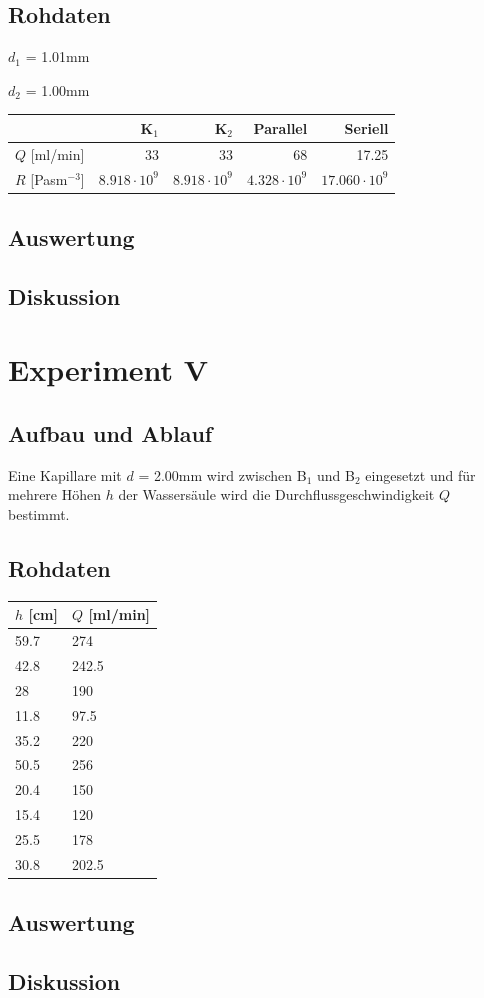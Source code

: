 \documentclass[12pt,a4paper]{article}
\newcommand{\subscript}[1]{$_{#1}$}
\newcommand{\B}[1]{B\subscript{#1}}
\begin{document}
\subsection*{Rohdaten}

$d_1$ = 1.01mm

$d_2$ = 1.00mm

\vspace{5pt}
\begin{tabular}{|l|r|r|r|r|}
\hline
&K\subscript{1}&K\subscript{2}&Parallel&Seriell\\
\hline
$Q$ [ml/min]&33&33&68&17.25\\
$R$ [Pasm$^{-3}$]&$8.918\cdot 10^9$&$8.918\cdot 10^9$&$4.328\cdot 10^9$&$17.060\cdot 10^9$\\
\hline
\end{tabular}

\subsection*{Auswertung}

\subsection*{Diskussion}


\section*{Experiment V}

\subsection*{Aufbau und Ablauf}
Eine Kapillare mit $d$ = 2.00mm wird zwischen \B{1} und \B{2} eingesetzt und f\"ur mehrere H\"ohen $h$ der Wassers\"aule wird die Durchflussgeschwindigkeit $Q$ bestimmt.

\subsection*{Rohdaten}
\begin{tabular}{|l|l|}
\hline
$h$ [cm]&$Q$ [ml/min]\\
\hline
59.7&274\\
42.8&242.5\\
28&190\\
11.8&97.5\\
35.2&220\\
50.5&256\\
20.4&150\\
15.4&120\\
25.5&178\\
30.8&202.5\\
\hline
\end{tabular}

\subsection*{Auswertung}

\subsection*{Diskussion}
\end{document}
